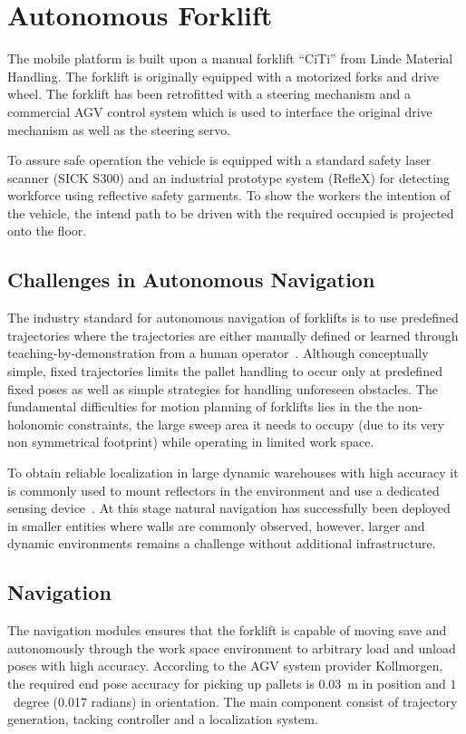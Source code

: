 \section{Autonomous Forklift}
\label{sec:agv}
%
The mobile platform is built upon a manual forklift ``CiTi'' from Linde Material Handling. The
forklift is originally equipped with a motorized forks and drive wheel. The forklift has been
retrofitted with a steering mechanism and a commercial AGV control system which is used to interface
the original drive mechanism as well as the steering servo.

To assure safe operation the vehicle is equipped with a standard safety laser scanner (SICK S300)
and an industrial prototype system (RefleX) for detecting workforce using reflective safety
garments. To show the workers the intention of the vehicle, the intend path to be driven with the
required occupied is projected onto the floor. 
%
\subsection{Challenges in Autonomous Navigation}
\label{subsec:AGV_challenges}
%
The industry standard for autonomous navigation of forklifts is to use predefined trajectories where
the trajectories are either manually defined or learned through teaching-by-demonstration from a
human operator~\cite{Hell06,Marsh08}.  Although conceptually simple, fixed trajectories limits the
pallet handling to occur only at predefined fixed poses as well as simple strategies for handling
unforeseen obstacles.  The fundamental difficulties for motion planning of forklifts lies in the the
non-holonomic constraints, the large sweep area it needs to occupy (due to its very non symmetrical
footprint) while operating in limited work space.

To obtain reliable localization in large dynamic warehouses with high accuracy it is commonly used
to mount reflectors in the environment and use a dedicated sensing device~\cite{Hyyp89}. At this
stage natural navigation has successfully been deployed in smaller entities where walls are commonly
observed, however, larger and dynamic environments remains a challenge without additional
infrastructure.
%
\subsection{Navigation}
\label{subsec:navigation}
%
The navigation modules ensures that the forklift is capable of moving save and autonomously through
the work space environment to arbitrary load and unload poses with high accuracy. According to the
AGV system provider Kollmorgen, the required end pose accuracy for picking up pallets is $0.03$~m in
position and $1$~degree (0.017 radians) in orientation. The main component consist of trajectory
generation, tacking controller and a localization system.
 
